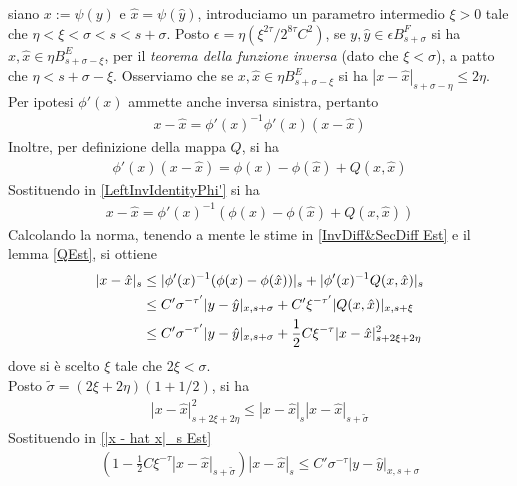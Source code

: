 \documentclass[twoside, 11pt]{amsbook}
\makeatletter
\newcommand{\0}{{(0)}}
\newcommand{\3}{{(3)}}
\theoremstyle{colonplain}
\theoremstyle{colondefinition}
\theoremstyle{colonremark}
\numberwithin{equation}{chapter}
\renewcommand{\proofname}{Dimostrazione}
\renewenvironment{proof}[1][\proofname]{\par
  \pushQED{\qed}%
  \normalfont \topsep6\p@\@plus6\p@\relax
  \trivlist
  \item[\hskip\labelsep\bfseries #1:]\ignorespaces
}{%
  \popQED\endtrivlist\@endpefalse
}
\makeatother
\begin{document}
\begin{proof} siano $x := \psi(y)$ e $\hat{x} = \psi(\hat{y})$, introduciamo un parametro intermedio $\xi > 0$ tale che $\eta < \xi < \sigma < s < s + \sigma$. Posto $\epsilon = \eta(\xi^{2\tau}/2^{8\tau}C^2)$, se $y, \hat{y} \in \epsilon B^F_{s + \sigma}$ si ha $x, \hat{x} \in \eta B^E_{s + \sigma - \xi}$, per il \textit{teorema della funzione inversa} (dato che $\xi < \sigma$), a patto che $\eta < s + \sigma - \xi$. Osserviamo che se $x, \hat{x} \in \eta B^E_{s + \sigma - \xi}$ si ha $|x - \hat{x}|_{s + \sigma - \eta} \leq 2\eta$. \\
Per ipotesi $\phi'(x)$ ammette anche inversa sinistra, pertanto
\begin{align}\label{LeftInvIdentityPhi'}
    x - \hat{x} = \phi'(x)^{-1}\phi'(x)(x - \hat{x}) 
\end{align}
Inoltre, per definizione della mappa $Q$, si ha
\begin{align}
    \phi'(x)(x - \hat{x}) = \phi(x) - \phi(\hat{x}) + Q(x, \hat{x}) 
\end{align}
Sostituendo in \eqref{LeftInvIdentityPhi'} si ha
\begin{align}
    x - \hat{x} = \phi'(x)^{-1}(\phi(x) - \phi(\hat{x}) + Q(x, \hat{x})) 
\end{align}
Calcolando la norma, tenendo a mente le stime in \eqref{InvDiff&SecDiff Est} e il lemma \ref{QEst}, si ottiene
\begin{align}
    |x - \hat{x}|_s &\leq |\phi'(x)^{-1}(\phi(x) - \phi(\hat{x}))|_s + |\phi'(x)^{-1}Q(x, \hat{x})|_s \notag \\
    &\leq C'\sigma^{-\tau'}|y - \hat{y}|_{x, s + \sigma} + C'\xi^{-\tau'}|Q(x, \hat{x})|_{x, s + \xi} \notag \\
    \label{|x - hat x|_s Est}
    &\leq C'\sigma^{-\tau'}|y - \hat{y}|_{x, s + \sigma} + \frac{1}{2}C\xi^{-\tau}|x - \hat{x}|^2_{s + 2\xi + 2\eta} 
\end{align}
dove si è scelto $\xi$ tale che $2\xi < \sigma$. \\
Posto $\widetilde{\sigma} = (2\xi + 2\eta)(1 + 1/2)$, si ha
\begin{align}
    |x - \hat{x}|^2_{s + 2\xi + 2\eta} \leq |x - \hat{x}|_s|x - \hat{x}|_{s + \widetilde{\sigma}} 
\end{align}
Sostituendo in \eqref{|x - hat x|_s Est}
\begin{align}
    \left(1 - \frac{1}{2}C\xi^{-\tau}|x - \hat{x}|_{s + \widetilde{\sigma}}\right)|x - \hat{x}|_{s} \leq C'\sigma^{-\tau}|y - \hat{y}|_{x, s + \sigma} 
\end{align}

\end{proof}
\end{document}
